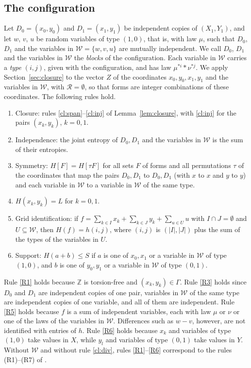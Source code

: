 \documentclass[11pt]{amsart}
\theoremstyle{definition}
\theoremstyle{remark}
\numberwithin{equation}{section}
\newcommand{\Z}{\mathbb{Z}}
\newcommand{\LmWvars}{w,v,u}
\newcommand{\LmWintro}{let $w$, $v$, $u$ be random variables of type $(1,0)$, that is, with law $\mu$}
\begin{document}
\subsection{The configuration}\label{sec:conf2}
Let $D_0=(x_0,y_0)$ and $D_1=(x_1,y_1)$ be independent copies of $(X_1,Y_1)$, and \LmWintro, such that $D_0$, $D_1$ and the variables in $\mathcal W=\{\LmWvars\}$ are mutually independent. We call $D_0$, $D_1$ and the variables in $\mathcal W$ the \emph{blocks} of the configuration. Each variable in $\mathcal W$ carries a \emph{type} $(i,j)$, given with the configuration, and has law $\mu^{*i}*\nu^{*j}$. We apply Section~\ref{sec:closure} to the vector $Z$ of the coordinates $x_0,y_0,x_1,y_1$ and the variables in $\mathcal W$, with $\mathcal R=\emptyset$, so that forms are integer combinations of these coordinates. The following rules hold.
\begin{enumerate}[label=(R\arabic*)]
\item\label{R1} Closure: rules \ref{cl:span}--\ref{cl:inj} of Lemma~\ref{lem:closure}, with \ref{cl:inj} for the pairs $(x_k,y_k)$, $k=0,1$.
\item\label{R2} Independence: the joint entropy of $D_0,D_1$ and the variables in $\mathcal W$ is the sum of their entropies.
\item\label{R3} Symmetry: $H[F]=H[\tau F]$ for all sets $F$ of forms and all permutations $\tau$ of the coordinates that map the pairs $D_0,D_1$ to $D_0,D_1$ (with $x$ to $x$ and $y$ to $y$) and each variable in $\mathcal W$ to a variable in $\mathcal W$ of the same type.
\item\label{R4} $H(x_k,y_k)=L$ for $k=0,1$.
\item\label{R5} Grid identification: if $f=\sum_{k\in I}x_k+\sum_{k\in J}y_k+\sum_{u\in U}u$ with $I\cap J=\emptyset$ and $U\subseteq\mathcal W$, then $H(f)=h(i,j)$, where $(i,j)$ is $(|I|,|J|)$ plus the sum of the types of the variables in $U$.
\item\label{R6} Support: $H(a+b)\le S$ if $a$ is one of $x_0,x_1$ or a variable in $\mathcal W$ of type $(1,0)$, and $b$ is one of $y_0,y_1$ or a variable in $\mathcal W$ of type $(0,1)$.
\end{enumerate}
Rule \ref{R1} holds because $\Z$ is torsion-free and $(x_k,y_k)\in\Gamma$. Rule \ref{R3} holds since $D_0$ and $D_1$ are independent copies of one pair, variables in $\mathcal W$ of the same type are independent copies of one variable, and all of them are independent. Rule \ref{R5} holds because $f$ is a sum of independent variables, each with law $\mu$ or $\nu$ or one of the laws of the variables in $\mathcal W$. Differences such as $w-v$, however, are not identified with entries of $h$. Rule \ref{R6} holds because $x_k$ and variables of type $(1,0)$ take values in $X$, while $y_l$ and variables of type $(0,1)$ take values in $Y$. Without $\mathcal W$ and without rule \ref{cl:div}, rules \ref{R1}--\ref{R6} correspond to the rules (R1)--(R7) of \cite[\S4.3]{Kle26}.
\end{document}

